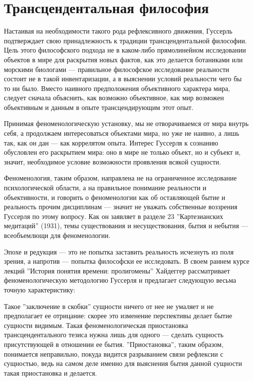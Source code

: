 \documentclass[11pt]{book}
\begin{document}
\section{Трансцендентальная философия}

Настаивая на необходимости такого рода рефлексивного движения, Гуссерль подтверждает свою принадлежность к традиции трансцендентальной философии. Цель этого философского подхода не в каком-либо прямолинейном исследовании объектов в мире для раскрытия новых фактов, как это делается ботаниками или морскими биологами --- правильное философское исследование реальности состоит не в такой инвентаризации, а в выяснении условий реальности чего бы то ни было. Вместо наивного предположения объективного характера мира, следует сначала объяснить, как возможно объективное, как мир возможен объективным и данным в опыте трансцендирующим этот опыт.

Принимая феноменологическую установку, мы не отворачиваемся от мира внутрь себя, а продолжаем интересоваться объектами мира, но уже не наивно, а лишь так, как он дан --- как коррелятом опыта. Интерес Гуссерля к сознанию обусловлен его раскрытием мира: оно в мире не только объект, но и субъект и, значит, необходимое условие возможности проявления всякой сущности.

Феноменология, таким образом, направлена не на ограниченное исследование психологической области, а на правильное понимание реальности и объективности, и говорить о феноменологии как об оставляющей бытие и реальность прочим дисциплинам --- значит не уважать собственные воззрения Гуссерля по этому вопросу. Как он заявляет в разделе 23 ''Картезианских медитаций'' (1931), темы существования и несуществования, бытия и небытия --- всеобъемлющи для феноменологии.

Эпохе и редукция --- это не попытка заставить реальность исчезнуть из поля зрения, а напротив --- попытка философски ее исследовать. В своем раннем курсе лекций ''История понятия времени: пролигомены'' Хайдеггер рассматривает феноменологическую методологию Гуссерля и предлагает следующую весьма точную характеристику:

\smallskip
{}\relax
{}\relax

Такое ''заключение в скобки'' сущности ничего от нее не умаляет и не предполагает ее отрицание: скорее это изменение перспективы делает бытие сущности видимым. Такая феноменологическая приостановка трансцендентального тезиса нужна лишь для одного --- сделать сущность присутствующей в отношении ее бытия. ''Приостановка'', таким образом, понимается неправильно, покуда видится разрыванием связи рефлексии с сущностью, ведь на самом деле именно для выяснения бытия данной сущности такая приостановка и делается.
\end{document}
